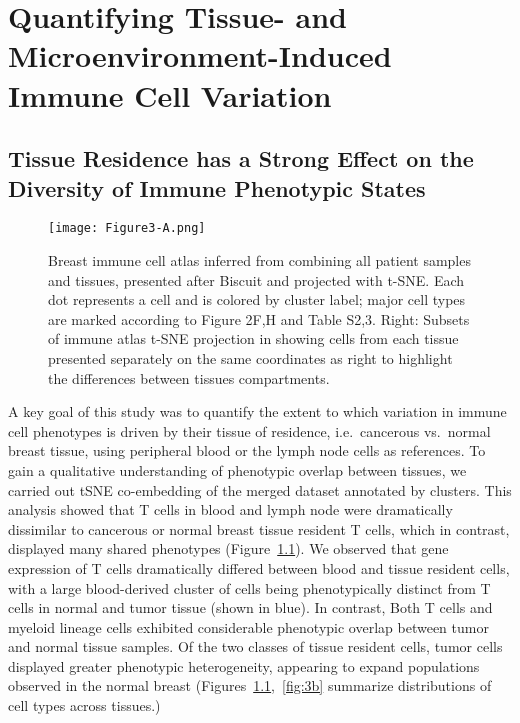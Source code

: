 
\chapter[Quantifying Tissue- and Microenvironment-Induced Immune Cell Variation][Quantifying Tissue- and Microenvironment-Induced Immune Cell Variation]{Quantifying Tissue- and Microenvironment-Induced Immune Cell Variation}


\section{Tissue Residence has a Strong Effect on the Diversity of Immune Phenotypic States}

\begin{figure}
\centering
\texttt{[image: Figure3-A.png]}
\caption{Breast immune cell atlas inferred from combining all patient samples and tissues, presented after Biscuit and projected with t-SNE\@. Each dot represents a cell and is colored by cluster label;  major cell types are marked according to Figure 2F,H and Table S2,3. Right: Subsets of immune atlas t-SNE projection in showing cells from each tissue presented separately on the same coordinates as right to highlight the differences between tissues compartments.
}  %
\label{fig:3a}
\end{figure}

A key goal of this study was to quantify the extent to which variation in immune cell phenotypes is driven by their tissue of residence, i.e.\ cancerous vs.\ normal breast tissue, using peripheral blood or the lymph node cells as references. 
To gain a qualitative understanding of phenotypic overlap between tissues, we carried out tSNE co-embedding \citep{Maaten2008} of the merged dataset annotated by clusters.
This analysis showed that T cells in blood and lymph node were dramatically dissimilar to cancerous or normal breast tissue resident T cells, which in contrast, displayed many shared phenotypes (Figure~\ref{fig:3a}).
We observed that gene expression of T cells dramatically differed between blood and tissue resident cells, with a large blood-derived cluster of cells being phenotypically distinct from T cells in normal and tumor tissue (shown in blue).
In contrast, Both T cells and myeloid lineage cells exhibited considerable phenotypic overlap between tumor and normal tissue samples. 
Of the two classes of tissue resident cells, tumor cells displayed greater phenotypic heterogeneity, appearing to expand populations observed in the normal breast (Figures~\ref{fig:3a},~\ref{fig:3b} summarize distributions of cell types across tissues.)


